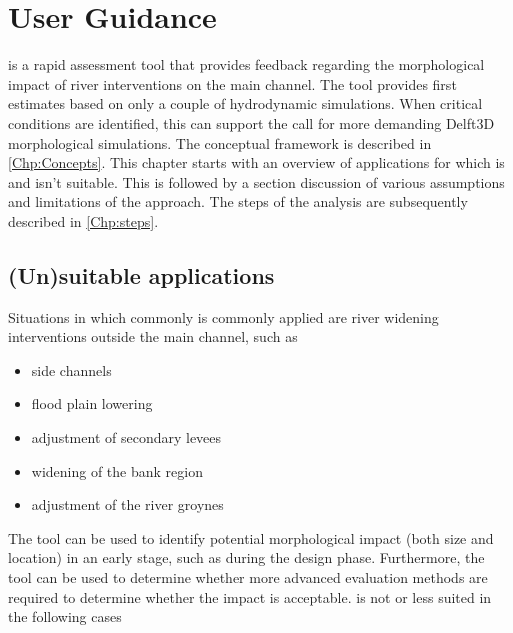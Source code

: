 \chapter{User Guidance}\label{Chp:Guidance}

\dfastmi is a rapid assessment tool that provides feedback regarding the morphological impact of river interventions on the main channel.
The tool provides first estimates based on only a couple of hydrodynamic simulations.
When critical conditions are identified, this can support the call for more demanding Delft3D morphological simulations.
The conceptual framework is described in \autoref{Chp:Concepts}.
This chapter starts with an overview of applications for which \dfmi is and isn't suitable.
This is followed by a section discussion of various assumptions and limitations of the \dfmi approach.
The steps of the analysis are subsequently described in \autoref{Chp:steps}.

\section{(Un)suitable applications}\label{Sec:SuitableApplications}

Situations in which commonly \dfmi is commonly applied are river widening interventions outside the main channel, such as

\begin{itemize}
\item side channels
\item flood plain lowering
\item adjustment of secondary levees
\item widening of the bank region
\item adjustment of the river groynes
\end{itemize}

The tool can be used to identify potential morphological impact (both size and location) in an early stage, such as during the design phase.
Furthermore, the tool can be used to determine whether more advanced evaluation methods are required to determine whether the impact is acceptable.
\dfmi is not or less suited in the following cases

